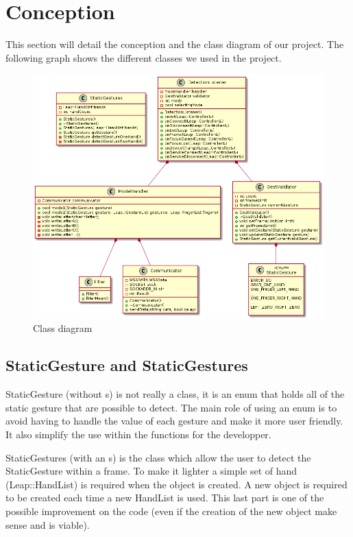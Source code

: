\section{Conception}

This section will detail the conception and the class diagram of our project. The following graph shows the different classes we used in the project.

\begin{figure}[H]
 \centering
 \includegraphics[scale=0.5]{../uml/classDiagram.png}
 \caption{Class diagram}
\end{figure}

\subsection{StaticGesture and StaticGestures}

StaticGesture (without s) is not really a class, it is an enum that holds all of the static gesture that are possible to detect. The main role of using an enum is to avoid having to handle the value of each gesture and make it more user friendly. It also simplify the use within the functions for the developper.

StaticGestures (with an s) is the class which allow the user to detect the StaticGesture within a frame. To make it lighter a simple set of hand (Leap::HandList) is required when the object is created. A new object is required to be created each time a new HandList is used. This last part is one of the possible improvement on the code (even if the creation of the new object make sense and is viable).

